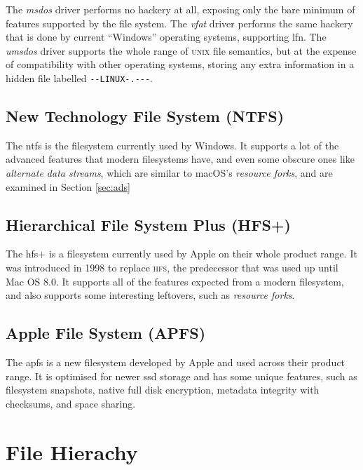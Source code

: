 \documentclass[a4paper]{article}
\begin{document}
The \emph{msdos} driver performs no hackery at all, exposing only the bare minimum of features supported by the file system. The \emph{vfat} driver performs the same hackery that is done by current “Windows” operating systems, supporting \gls{lfn}. The \emph{umsdos} driver supports the whole range of \textsc{unix} file semantics, but at the expense of compatibility with other operating systems, storing any extra information in a hidden file labelled \verb|--LINUX-.---|.

\subsection{New Technology File System (NTFS)}


The \gls{ntfs} is the filesystem currently used by Windows. It supports a lot of the advanced features that modern filesystems have, and even some obscure ones like \emph{alternate data streams}, which are similar to macOS's \emph{resource forks}, and are examined in Section \ref{sec:ads}

\subsection{Hierarchical File System Plus (HFS+)}


The \gls{hfs+} is a filesystem currently used by Apple on their whole product range. It was introduced in 1998 to replace \textsc{hfs}, the predecessor that was used up until Mac OS 8.0. It supports all of the features expected from a modern filesystem, and also supports some interesting leftovers, such as \emph{resource forks}.

\subsection{Apple File System (APFS)}

The \gls{apfs} is a new filesystem developed by Apple and used across their product range. It is optimised for newer \gls{ssd} storage and has some unique features, such as filesystem snapshots, native full disk encryption, metadata integrity with checksums, and space sharing.

\section{File Hierachy}
\end{document}
